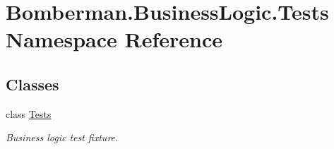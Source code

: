 \hypertarget{namespace_bomberman_1_1_business_logic_1_1_tests}{}\section{Bomberman.\+Business\+Logic.\+Tests Namespace Reference}
\label{namespace_bomberman_1_1_business_logic_1_1_tests}
\subsection*{Classes}
\begin{DoxyCompactItemize}
\item 
class \mbox{\hyperlink{class_bomberman_1_1_business_logic_1_1_tests_1_1_tests}{Tests}}
\begin{DoxyCompactList}\small\item\em Business logic test fixture. \end{DoxyCompactList}\end{DoxyCompactItemize}
